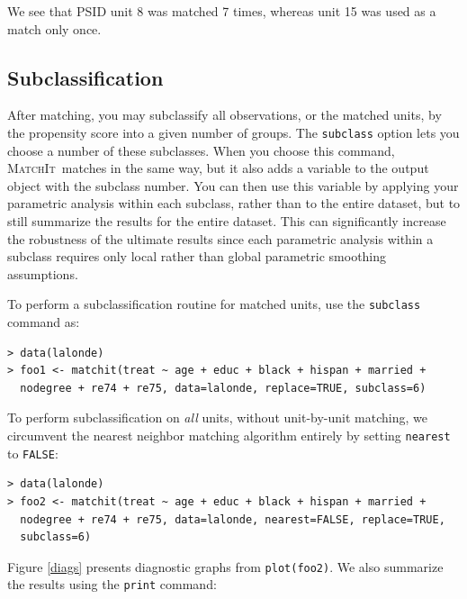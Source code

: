 \documentclass[oneside,letterpaper,titlepage]{article}
\newcommand{\MatchIt}{\textsc{MatchIt}}
\begin{document}
We see that PSID unit 8 was matched 7 times, whereas unit 15 was used
as a match only once.

\subsection{Subclassification}

After matching, you may subclassify all observations, or the matched
units, by the propensity score into a given number of groups.  The
\texttt{subclass} option lets you choose a number of these subclasses.
When you choose this command, \MatchIt\ matches in the same way, but
it also adds a variable to the output object with the subclass number.
You can then use this variable by applying your parametric analysis
within each subclass, rather than to the entire dataset, but to still
summarize the results for the entire dataset.  This can significantly
increase the robustness of the ultimate results since each parametric
analysis within a subclass requires only local rather than global
parametric smoothing assumptions.

To perform a subclassification routine for matched units, use the
\texttt{subclass} command as:

\begin{verbatim}
> data(lalonde) 
> foo1 <- matchit(treat ~ age + educ + black + hispan + married +
  nodegree + re74 + re75, data=lalonde, replace=TRUE, subclass=6)
\end{verbatim}

To perform subclassification on \emph{all} units, without unit-by-unit
matching, we circumvent the nearest neighbor matching algorithm
entirely by setting \texttt{nearest} to \texttt{FALSE}:

\begin{verbatim}
> data(lalonde) 
> foo2 <- matchit(treat ~ age + educ + black + hispan + married +
  nodegree + re74 + re75, data=lalonde, nearest=FALSE, replace=TRUE,
  subclass=6)
\end{verbatim}

Figure \ref{diags} presents diagnostic graphs from \texttt{plot(foo2)}.  
We also summarize the results using the {\tt print} command:
\end{document}
